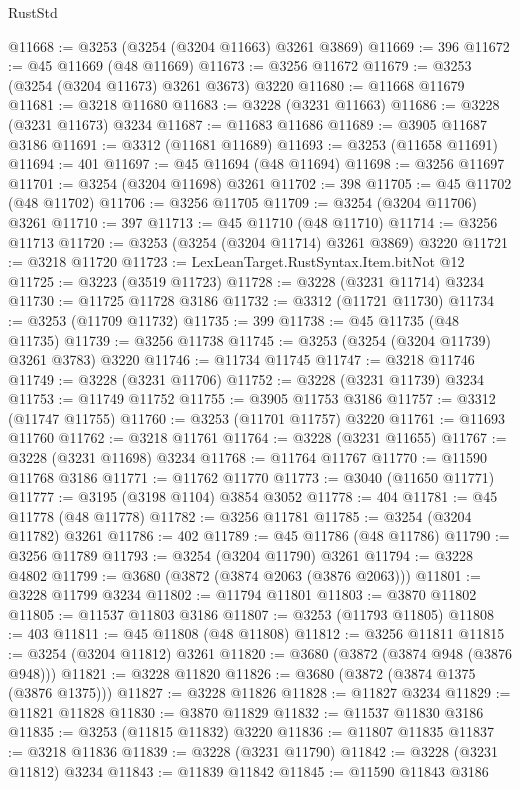 \begin{lexlean}{RustStd}
\begin{coremodule}
@11668 := @3253 (@3254 (@3204 @11663) @3261 @3869)
@11669 := 396
@11672 := @45 @11669 (@48 @11669)
@11673 := @3256 @11672
@11679 := @3253 (@3254 (@3204 @11673) @3261 @3673) @3220
@11680 := @11668 @11679
@11681 := @3218 @11680
@11683 := @3228 (@3231 @11663)
@11686 := @3228 (@3231 @11673) @3234
@11687 := @11683 @11686
@11689 := @3905 @11687 @3186
@11691 := @3312 (@11681 @11689)
@11693 := @3253 (@11658 @11691)
@11694 := 401
@11697 := @45 @11694 (@48 @11694)
@11698 := @3256 @11697
@11701 := @3254 (@3204 @11698) @3261
@11702 := 398
@11705 := @45 @11702 (@48 @11702)
@11706 := @3256 @11705
@11709 := @3254 (@3204 @11706) @3261
@11710 := 397
@11713 := @45 @11710 (@48 @11710)
@11714 := @3256 @11713
@11720 := @3253 (@3254 (@3204 @11714) @3261 @3869) @3220
@11721 := @3218 @11720
@11723 := LexLeanTarget.RustSyntax.Item.bitNot @12
@11725 := @3223 (@3519 @11723)
@11728 := @3228 (@3231 @11714) @3234
@11730 := @11725 @11728 @3186
@11732 := @3312 (@11721 @11730)
@11734 := @3253 (@11709 @11732)
@11735 := 399
@11738 := @45 @11735 (@48 @11735)
@11739 := @3256 @11738
@11745 := @3253 (@3254 (@3204 @11739) @3261 @3783) @3220
@11746 := @11734 @11745
@11747 := @3218 @11746
@11749 := @3228 (@3231 @11706)
@11752 := @3228 (@3231 @11739) @3234
@11753 := @11749 @11752
@11755 := @3905 @11753 @3186
@11757 := @3312 (@11747 @11755)
@11760 := @3253 (@11701 @11757) @3220
@11761 := @11693 @11760
@11762 := @3218 @11761
@11764 := @3228 (@3231 @11655)
@11767 := @3228 (@3231 @11698) @3234
@11768 := @11764 @11767
@11770 := @11590 @11768 @3186
@11771 := @11762 @11770
@11773 := @3040 (@11650 @11771)
@11777 := @3195 (@3198 @1104) @3854 @3052
@11778 := 404
@11781 := @45 @11778 (@48 @11778)
@11782 := @3256 @11781
@11785 := @3254 (@3204 @11782) @3261
@11786 := 402
@11789 := @45 @11786 (@48 @11786)
@11790 := @3256 @11789
@11793 := @3254 (@3204 @11790) @3261
@11794 := @3228 @4802
@11799 := @3680 (@3872 (@3874 @2063 (@3876 @2063)))
@11801 := @3228 @11799 @3234
@11802 := @11794 @11801
@11803 := @3870 @11802
@11805 := @11537 @11803 @3186
@11807 := @3253 (@11793 @11805)
@11808 := 403
@11811 := @45 @11808 (@48 @11808)
@11812 := @3256 @11811
@11815 := @3254 (@3204 @11812) @3261
@11820 := @3680 (@3872 (@3874 @948 (@3876 @948)))
@11821 := @3228 @11820
@11826 := @3680 (@3872 (@3874 @1375 (@3876 @1375)))
@11827 := @3228 @11826
@11828 := @11827 @3234
@11829 := @11821 @11828
@11830 := @3870 @11829
@11832 := @11537 @11830 @3186
@11835 := @3253 (@11815 @11832) @3220
@11836 := @11807 @11835
@11837 := @3218 @11836
@11839 := @3228 (@3231 @11790)
@11842 := @3228 (@3231 @11812) @3234
@11843 := @11839 @11842
@11845 := @11590 @11843 @3186

\end{coremodule}
\end{lexlean}
